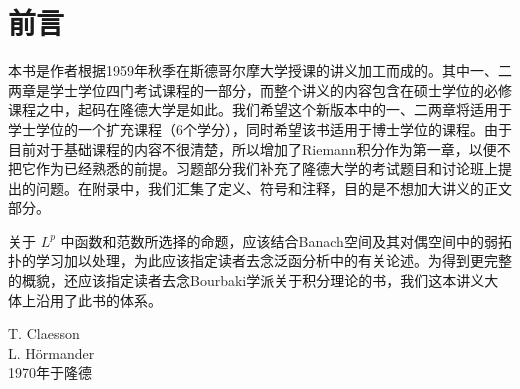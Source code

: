 \chapter*{前言}
本书是作者根据1959年秋季在斯德哥尔摩大学授课的讲义加工而成的。其中一、二两章是学士学位四门考试课程的一部分，而整个讲义的内容包含在硕士学位的必修课程之中，起码在隆德大学是如此。我们希望这个新版本中的一、二两章将适用于学士学位的一个扩充课程（6个学分），同时希望该书适用于博士学位的课程。由于目前对于基础课程的内容不很清楚，所以增加了Riemann积分作为第一章，以便不把它作为已经熟悉的前提。习题部分我们补充了隆德大学的考试题目和讨论班上提出的问题。在附录中，我们汇集了定义、符号和注释，目的是不想加大讲义的正文部分。

关于 $L^p$ 中函数和范数所选择的命题，应该结合Banach空间及其对偶空间中的弱拓扑的学习加以处理，为此应该指定读者去念泛函分析中的有关论述。为得到更完整的概貌，还应该指定读者去念Bourbaki学派关于积分理论的书，我们这本讲义大体上沿用了此书的体系。
\vspace{15pt}\begin{flushright}T. Claesson\\L. H\"ormander\\1970年于隆德\end{flushright}
